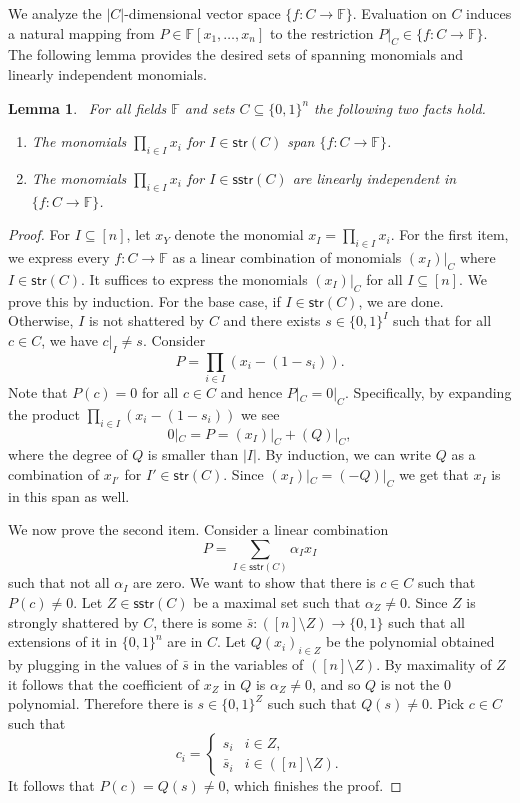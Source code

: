 \documentclass[11pt]{article}
\newtheorem{lemma}[theorem]{Lemma}
\theoremstyle{definition}
\newcommand{\1}{\mathbf{1}}
\newcommand{\F}{{\mathbb F}}
\newcommand{\sstr}{\mathsf{sstr}}
\newcommand{\str}{\mathsf{str}}
\begin{document}
We analyze the $|C|$-dimensional vector space $\{ f: C\rightarrow\mathbb F\}.$
Evaluation on $C$ induces a natural mapping from $P \in \F[x_1,\ldots,x_n]$ to the restriction $P|_C \in \{f: C \to \F\}$.  
 The following lemma provides the desired sets of spanning monomials and linearly independent monomials.
\begin{lemma}\ For all fields $\F$ and sets $C \subseteq \{0,1\}^n$ the following two facts hold. 
\begin{enumerate}
\item The monomials $\prod_{i\in I} x_i$ for $I\in\str(C)$ span $\{f:C\rightarrow \F\}$.
\item The monomials  $\prod_{i\in I} x_i$ for $I\in\sstr(C)$  are linearly independent in $\{f:C\rightarrow \F\}$.
\end{enumerate}
\end{lemma}
\begin{proof}

For $I\subseteq [n]$, let $x_Y$ denote the monomial $x_I=\prod_{i\in I}x_i$.  For the first item, we express every $f:C\rightarrow \F$ as a linear combination of
monomials $(x_I)|_C$ where $I\in\str(C)$.  
It suffices to express the monomials $(x_I)|_C$ for all $I \subseteq [n]$.   We prove this by induction.  For the base case, if  $I \in\str(C)$, we are done.  
Otherwise, $I$ is not shattered by $C$ and
there exists $s\in\{0,1\}^I$ such that for all $c\in C$, we have 
$c|_I \neq s.$
Consider 
$$P=\prod_{i\in I}\left(x_i-\left(1-s_i\right)\right).$$
Note that $P(c)=0$ for all $c\in C$ and hence
$P|_C = 0|_C.$
Specifically, by expanding the product $\prod_{i\in I}\left(x_i-\left(1-s_i\right)\right)$ we see
$$0|_C = P = (x_I)|_C + (Q)|_C,$$
where the degree of $Q$ is smaller than $|I|$.   By induction, we can write $Q$ as a combination of $x_{I'}$ for $I' \in \str(C)$.
Since $(x_I)|_C = (-Q)|_C$ we get that $x_I$ is in this span as well.

We now prove the second item.
Consider a linear combination
$$P=\sum_{I\in\sstr(C)}{\alpha_I x_I}$$
such that not all $\alpha_I$ are zero. 
We want to show that there is $c\in C$
such that $P(c)\neq 0$.
Let $Z\in\sstr(C)$ be a maximal set such that $\alpha_Z\neq0$.
Since $Z$ is strongly shattered by $C$, there is some $\bar s:([n]\setminus Z)\rightarrow\{0,1\}$
such that all extensions of it in $\{0,1\}^n$ are in $C$. Let $Q(x_i)_{i\in Z}$ be the polynomial 
obtained by plugging in the values of $\bar s$ in the variables of $([n]\setminus Z)$.
By maximality of $Z$ it follows that the coefficient of $x_Z$ in $Q$ is $\alpha_Z\neq 0$, and so $Q$ is not the $0$ polynomial.
Therefore there is $s\in\{0,1\}^Z$ such such that $Q(s)\neq 0$.
Pick $c\in C$ such that
$$c_i = \begin{cases}
s_i  &i\in Z,\\
\bar s_i &i\in ([n]\setminus Z).
\end{cases}$$
It follows that $P(c) = Q(s)\neq 0$, which finishes the proof.
\end{proof}
\end{document}
